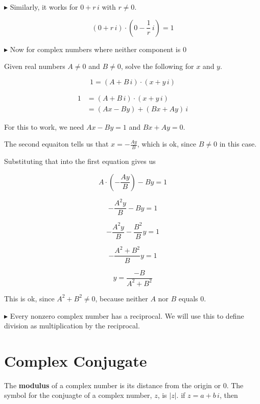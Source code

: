 \documentclass{ximera}
\begin{document}
$\blacktriangleright$  Similarly, it works for $0 + r \, i$ with $r \ne 0$.


\[   (0 + r \, i) \cdot \left(0 - \frac{1}{r} \, i \right) = 1        \]





$\blacktriangleright$ Now for complex numbers where neither component is $0$


Given real numbers $A \ne 0$ and $B \ne 0$, solve the following for $x$ and $y$.


\[       1 = (A + B \, i) \cdot (x + y \, i)            \]



\begin{align*}
1          & = (A + B \, i) \cdot (x + y \, i)      \\
           & = (Ax-By) + (Bx+Ay) \, i
\end{align*}


For this to work, we need $A x - B y = 1$ and $B x + A y = 0$.



The second equaiton tells us that $x = -\frac{A y}{B}$, which is ok, since $B \ne 0$ in this case.

Substituting that into the first equation gives us


\[   A \cdot \left(-\frac{A y}{B}\right) - B y = 1     \]


\[   -\frac{A^2 y}{B} - B y = 1     \]

\[   -\frac{A^2 y}{B} - \frac{B^2}{B} y = 1     \]


\[   -\frac{A^2 + B^2}{B} y = 1     \]


\[  y = \frac{-B}{A^2 + B^2}     \]

This is ok, since $A^2 + B^2 \ne 0$, because neither $A$ nor $B$ equals $0$.




$\blacktriangleright$  Every nonzero complex number has a reciprocal.  We will use this to define division as multiplication by the reciprocal.





\section{Complex Conjugate}


The \textbf{modulus} of a complex number is its distance from the origin or $0$.  The symbol for the conjuagte of a complex number, $z$, is $|z|$.  if $z = a + b \, i$, then
\end{document}
